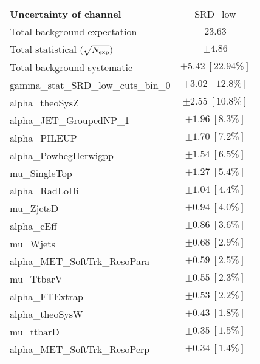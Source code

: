 
\begin{table}
\begin{center}
\setlength{\tabcolsep}{0.0pc}
\begin{tabular*}{\textwidth}{@{\extracolsep{\fill}}lc}
\noalign{\smallskip}\hline\noalign{\smallskip}
{\bf Uncertainty of channel}                                    & SRD\_low            \\
\noalign{\smallskip}\hline\noalign{\smallskip}
Total background expectation             &  $23.63$       \\
\noalign{\smallskip}\hline\noalign{\smallskip}
Total statistical $(\sqrt{N_{\rm exp}})$              & $\pm 4.86$       \\
Total background systematic               & $\pm 5.42\ [22.94\%] $             \\
\noalign{\smallskip}\hline\noalign{\smallskip}
\noalign{\smallskip}\hline\noalign{\smallskip}
gamma\_stat\_SRD\_low\_cuts\_bin\_0         & $\pm 3.02\ [12.8\%] $       \\
alpha\_theoSysZ         & $\pm 2.55\ [10.8\%] $       \\
alpha\_JET\_GroupedNP\_1         & $\pm 1.96\ [8.3\%] $       \\
alpha\_PILEUP         & $\pm 1.70\ [7.2\%] $       \\
alpha\_PowhegHerwigpp         & $\pm 1.54\ [6.5\%] $       \\
mu\_SingleTop         & $\pm 1.27\ [5.4\%] $       \\
alpha\_RadLoHi         & $\pm 1.04\ [4.4\%] $       \\
mu\_ZjetsD         & $\pm 0.94\ [4.0\%] $       \\
alpha\_cEff         & $\pm 0.86\ [3.6\%] $       \\
mu\_Wjets         & $\pm 0.68\ [2.9\%] $       \\
alpha\_MET\_SoftTrk\_ResoPara         & $\pm 0.59\ [2.5\%] $       \\
mu\_TtbarV         & $\pm 0.55\ [2.3\%] $       \\
alpha\_FTExtrap         & $\pm 0.53\ [2.2\%] $       \\
alpha\_theoSysW         & $\pm 0.43\ [1.8\%] $       \\
mu\_ttbarD         & $\pm 0.35\ [1.5\%] $       \\
alpha\_MET\_SoftTrk\_ResoPerp         & $\pm 0.34\ [1.4\%] $       \\

\end{tabular*}
\end{center}
\end{table}
